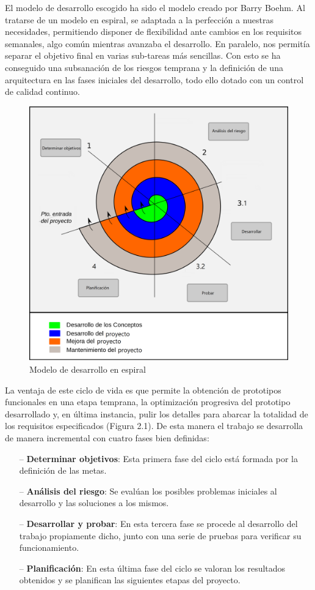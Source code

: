  El modelo de desarrollo escogido ha sido el modelo creado por Barry Boehm. Al tratarse de un modelo en espiral, se adaptada a la perfección a nuestras necesidades, permitiendo disponer de flexibilidad ante cambios en los requisitos semanales, algo común mientras avanzaba el desarrollo. En paralelo, nos permitía separar el objetivo final en varias sub-tareas más sencillas. Con esto se ha conseguido una subsanación de los riesgos temprana y la definición de una arquitectura en las fases iniciales del desarrollo, todo ello dotado con un control de calidad continuo.

\begin{figure}[H]
  \begin{center}
    \includegraphics[width=0.55\linewidth]{figures/modelo_espiral.png}
		\caption{Modelo de desarrollo en espiral}
		\label{fig.espiral}
		\end{center}
\end{figure}

La ventaja de este ciclo de vida es que permite la obtención de prototipos funcionales en una etapa temprana, la optimización progresiva del prototipo desarrollado y, en última instancia, pulir los detalles para abarcar la totalidad de los requisitos especificados (Figura 2.1). De esta manera el trabajo se desarrolla de manera incremental con cuatro fases bien definidas:

\begin{itemize}
	\item[--] \textbf{Determinar objetivos}: Esta primera fase del ciclo está formada por la definición de las metas.
	\item[--] \textbf{Análisis del riesgo}: Se evalúan los posibles problemas iniciales al desarrollo y las soluciones a los mismos.
	\item[--] \textbf{Desarrollar y probar}: En esta tercera fase se procede al desarrollo del trabajo propiamente dicho, junto con una serie de pruebas para verificar su funcionamiento.
	\item[--] \textbf{Planificación}: En esta última fase del ciclo se valoran los resultados obtenidos y se planifican las siguientes etapas del proyecto.
\end{itemize}

